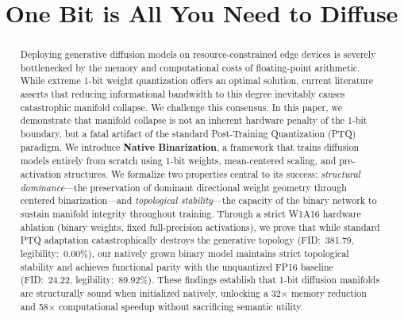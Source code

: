 \documentclass[conference]{IEEEtran}
\begin{document}
\title{One Bit is All You Need to Diffuse}

\author{
}

\maketitle

\begin{abstract}
Deploying generative diffusion models on resource-constrained edge devices is severely
bottlenecked by the memory and computational costs of floating-point arithmetic. While
extreme 1-bit weight quantization offers an optimal solution, current literature asserts
that reducing informational bandwidth to this degree inevitably causes catastrophic
manifold collapse. We challenge this consensus. In this paper, we demonstrate that
manifold collapse is not an inherent hardware penalty of the 1-bit boundary, but a fatal
artifact of the standard Post-Training Quantization (PTQ) paradigm. We introduce
\textbf{Native Binarization}, a framework that trains diffusion models entirely from
scratch using 1-bit weights, mean-centered scaling, and pre-activation structures. We
formalize two properties central to its success: \emph{structural dominance}---the
preservation of dominant directional weight geometry through centered binarization---and
\emph{topological stability}---the capacity of the binary network to sustain manifold
integrity throughout training. Through a strict W1A16 hardware ablation (binary weights,
fixed full-precision activations), we prove that while standard PTQ adaptation
catastrophically destroys the generative topology (FID:~381.79, legibility:~0.00\%), our
natively grown binary model maintains strict topological stability and achieves functional
parity with the unquantized FP16 baseline (FID:~24.22, legibility:~89.92\%). These
findings establish that 1-bit diffusion manifolds are structurally sound when initialized
natively, unlocking a 32$\times$ memory reduction and 58$\times$ computational speedup
without sacrificing semantic utility.
\end{abstract}
\end{document}

